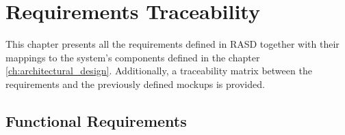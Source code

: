 \chapter{Requirements Traceability} \label{ch:requirements_traceability}

This chapter presents all the requirements defined in RASD together with their mappings to the system's components defined in the chapter \ref{ch:architectural_design}. Additionally, a traceability matrix between the requirements and the previously defined mockups is provided.


\section{Functional Requirements}

